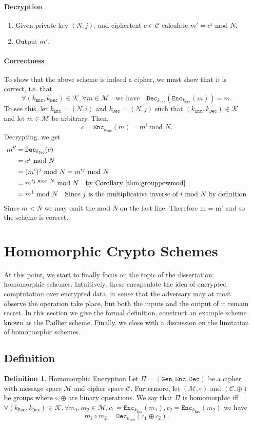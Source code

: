 \documentclass{article}
\theoremstyle{definition}
\newtheorem{definition}{Definition}[section]
\newcommand{\Enc}{\texttt{Enc}}
\newcommand{\Dec}{\texttt{Dec}}
\newcommand{\Gen}{\texttt{Gen}}
\newcommand{\M}{\mathcal{M}}
\renewcommand{\C}{\mathcal{C}}
\newcommand{\K}{\mathcal{K}}
\renewcommand{\mod}{\,\,\text{mod}\,\,}
\begin{document}
\paragraph{Decryption}
\begin{enumerate}
\item Given private key $(N, j)$, and ciphertext $c \in \C$ calculate $m'= c^j \mod
  N$.
\item Output $m'$.
\end{enumerate}
\paragraph{Correctness} To show that the above scheme is indeed a cipher, we
must show that it is correct, i.e. that
\[
  \forall (k_\Enc, k_\Dec) \in \K, \forall m \in \M\quad\text{we have}\quad
  \Dec_{k_\Dec}(\Enc_{k_\Enc}(m)) = m.
\]
To see this, let $k_\Enc = (N, i)$ and $k_\Dec = (N, j)$ such that $(k_\Enc,
k_\Dec) \in \K$ and let $m \in \M$ be arbitrary. Then,
\[
  c = \Enc_{k_\Enc}(m) = m^i \mod N.
\]
Decrypting, we get
\begin{align*}
  m'' &= \Dec_{k_\Dec}(c) \\
     &= c^j \mod N \\
     &= (m^i)^j \mod N = m^{ij} \mod N \\
     &= m^{ij \mod N} \mod N \quad \text{by Corollary \ref{thm:grouppowmod}} \\
     &= m^1 \mod N \quad \text{Since $j$ is the multiplicative inverse of $i$ mod $N$ by definition}
\end{align*}
Since $m < N$ we may omit the mod $N$ on the last line. Therefore m = m' and so the scheme is correct.
\section{Homomorphic Crypto Schemes}
\paragraph{}
At this point, we start to finally focus on the topic of the dissertation:
homomorphic schemes. Intuitively, these encapsulate the idea of encrypted
comptutation over encrypted data, in sense that the adversary may at most
observe the operation take place, but both the inputs and the output of it
remain secret. In this section we give the formal definition, construct an
example scheme known as the Paillier scheme. Finally, we close with a discussion
on the limitation of homomorphic schemes.
\subsection{Definition}
\begin{definition}{Homomorphic Encryption}
  Let $\Pi = (\Gen, \Enc, \Dec)$ be a cipher with message space $\M$ and cipher
  space $\C$. Furtermore, let $(\M, \circ)$ and $(\C, \oplus)$ be groups where
  $\circ, \oplus$ are binary operations.
  We say that $\Pi$ is homomorphic iff $\forall (k_\Enc, k_\Dec) \in \K, \forall
  m_1, m_2 \in \M, c_1 = \Enc_{k_\Enc}(m_1), c_2 = \Enc_{k_\Enc}(m_2)$ we have
  \[
    m_1 \circ m_2 = \Dec_{k_\Dec}(c_1 \oplus c_2).
  \]
\end{definition}
\end{document}
